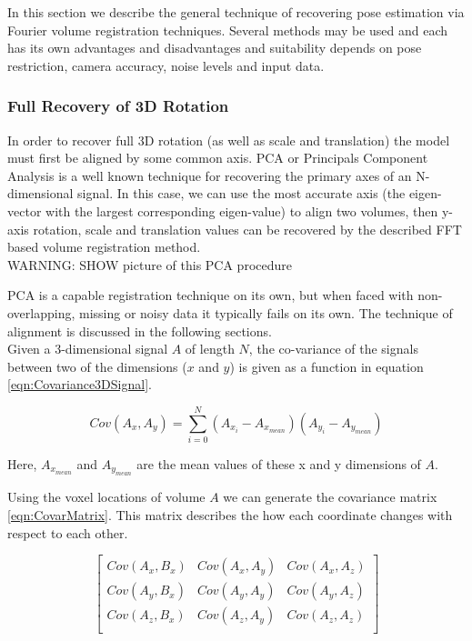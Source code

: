 
In this section we describe the general technique of recovering pose estimation via Fourier volume registration techniques. Several methods may be used and each has its own advantages and disadvantages and suitability depends on pose restriction, camera accuracy, noise levels and input data. 

\subsubsection{Full Recovery of 3D Rotation}

\label{FullRecovery3DSection}

In order to recover full 3D rotation (as well as scale and translation) the model must first be aligned by some common axis. PCA or Principals Component Analysis is a well known technique for recovering the primary axes of an N-dimensional signal. In this case, we can use the most accurate axis (the eigen-vector with the largest corresponding eigen-value) to align two volumes, then y-axis rotation, scale and translation values can be recovered by the described FFT based volume registration method. \\

WARNING: SHOW picture of this PCA procedure

PCA is a capable registration technique on its own, but when faced with non-overlapping, missing or noisy data it typically fails on its own. The technique of alignment is discussed in the following sections. \\

Given a 3-dimensional signal $A$ of length $N$, the co-variance of the signals between two of the dimensions ($x$ and $y$) is given as a function in equation \ref{eqn:Covariance3DSignal}.

\begin{equation} \label{eqn:Covariance3DSignal}
Cov(A_x,A_y) = \sum_{i=0}^{N}(A_{x_i} - A_{x_{mean}})(A_{y_i} - A_{y_{mean}})
\end{equation}

Here, $A_{x_{mean}}$ and $A_{y_{mean}}$ are the mean values of these x and y dimensions of $A$. 

Using the voxel locations of volume $A$ we can generate the covariance matrix \ref{eqn:CovarMatrix}. This matrix describes the how each coordinate changes with respect to each other.

\begin{equation} \label{eqn:CovarMatrix}
\left[
\begin{array}{ccc}
Cov(A_x, B_x) & Cov(A_x, A_y) & Cov(A_x, A_z) \\
Cov(A_y, B_x) & Cov(A_y, A_y) & Cov(A_y, A_z) \\
Cov(A_z, B_x) & Cov(A_z, A_y) & Cov(A_z, A_z) \\
\end{array}
\right]
\end{equation}

